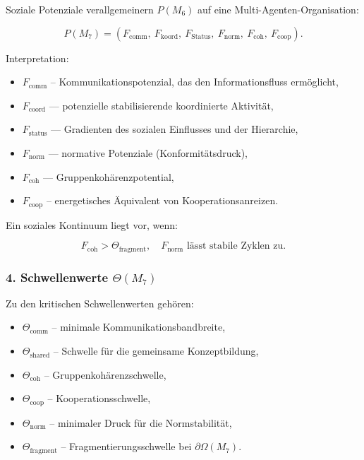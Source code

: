 Soziale Potenziale verallgemeinern $P(M_6)$ auf eine Multi-Agenten-Organisation:

\[
P(M_7)=
(F_{\mathrm{comm}},\
F_{\mathrm{koord}},\
F_{\mathrm{Status}},\
F_{\mathrm{norm}},\
F_{\mathrm{coh}},\
F_{\mathrm{coop}}).
\]

Interpretation:

\begin{itemize}
    \item $F_{\mathrm{comm}}$ – Kommunikationspotenzial, das den Informationsfluss ermöglicht,
    \item $F_{\mathrm{coord}}$ — potenzielle stabilisierende koordinierte Aktivität,
    \item $F_{\mathrm{status}}$ — Gradienten des sozialen Einflusses und der Hierarchie,
    \item $F_{\mathrm{norm}}$ — normative Potenziale (Konformitätsdruck),
    \item $F_{\mathrm{coh}}$ — Gruppenkohärenzpotential,
    \item $F_{\mathrm{coop}}$ – energetisches Äquivalent von Kooperationsanreizen.
\end{itemize}

Ein soziales Kontinuum liegt vor, wenn:

\[
F_{\mathrm{coh}} > \Theta_{\mathrm{fragment}},
\quad F_{\mathrm{norm}} \text{ lässt stabile Zyklen zu}.
\]

\subsubsection*{4. Schwellenwerte \texorpdfstring{$\Theta(M_7)$}{\Theta(M_7)}}

Zu den kritischen Schwellenwerten gehören:

\begin{itemize}
    \item $\Theta_{\mathrm{comm}}$ – minimale Kommunikationsbandbreite,
    \item $\Theta_{\mathrm{shared}}$ – Schwelle für die gemeinsame Konzeptbildung,
    \item $\Theta_{\mathrm{coh}}$ – Gruppenkohärenzschwelle,
    \item $\Theta_{\mathrm{coop}}$ – Kooperationsschwelle,
    \item $\Theta_{\mathrm{norm}}$ – minimaler Druck für die Normstabilität,
    \item $\Theta_{\mathrm{fragment}}$ – Fragmentierungsschwelle bei $\partial\Omega(M_7)$.
\end{itemize}

